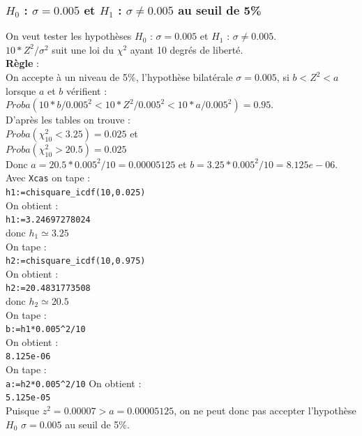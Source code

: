 \documentclass[a4paper,11pt]{book}
\begin{document}
\subsubsection{$H_0$ : $\sigma=0.005$ et $H_1$ : $\sigma\neq 0.005$ au  seuil de 5\%}\label{sec;sigma}
On veut tester les hypoth\`eses $H_0$ : $\sigma=0.005$  et $H_1$ :
$\sigma \neq 0.005$.\\
$10*Z^2/\sigma^2$ suit une loi du $\chi^2$ ayant 10 degr\'es de libert\'e.\\
{\bf R\`egle} :\\
On accepte \`a un niveau  de 5\%, l'hypoth\`ese bilat\'erale $\sigma=0.005$,
 si $b<Z^2<a$ lorsque $a$ et $b$ v\'erifient :\\
$Proba(10*b/0.005^2<10*Z^2/0.005^2<10*a/0.005^2)=0.95$.\\
D'apr\`es les tables on trouve :\\
$Proba(\chi^2_{10}<3.25)=0.025$ et \\
$Proba(\chi^2_{10}>20.5)=0.025$\\
Donc $a=20.5*0.005^2/10=0.00005125$ et $b=3.25*0.005^2/10=8.125e-06$.\\
Avec {\tt Xcas} on tape :\\
{\tt h1:=chisquare\_icdf(10,0.025)}\\
On obtient :\\
{\tt h1:=3.24697278024}\\
donc $h_1 \simeq 3.25$\\
On tape :\\
{\tt h2:=chisquare\_icdf(10,0.975)}\\
On obtient :\\
{\tt h2:=20.4831773508}\\
donc $h_2  \simeq 20.5$\\
On tape :\\
{\tt b:=h1*0.005\verb|^|2/10}\\
On obtient :\\
{\tt 8.125e-06}\\
On tape :\\
{\tt a:=h2*0.005\verb|^|2/10}
On obtient :\\
{\tt 5.125e-05}\\
Puisque $z^2=0.00007>a=0.00005125$, on ne peut donc pas accepter l'hypoth\`ese 
$H_0$ $\sigma=0.005$ au seuil de 5\%.
\end{document}
